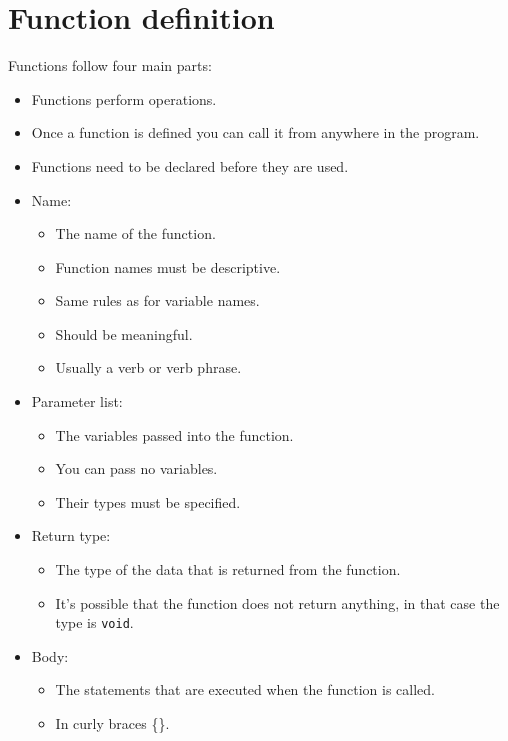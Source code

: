 \section{Function definition}
Functions follow four main parts:
\begin{itemize}
    \item Functions perform operations.
    \item Once a function is defined you can call it from anywhere in the program. 
    \item Functions need to be declared before they are used.
\end{itemize}
\begin{itemize}
    \item Name: 
        \begin{itemize}
            \item The name of the function.
            \item Function names must be descriptive.
            \item Same rules as for variable names.
            \item Should be meaningful.
            \item Usually a verb or verb phrase.
        \end{itemize}
    
    \item Parameter list:
        \begin{itemize}
            \item The variables passed into the function.
            \item You can pass no variables.
            \item Their types must be specified.
        \end{itemize}
    
    \item Return type:
        \begin{itemize}
            \item The type of the data that is returned from the function.
            \item It's possible that the function does not return anything, in that case the type is \texttt{void}.
        \end{itemize}
    
    \item Body: 
        \begin{itemize}
            \item The statements that are executed when the function is called.
            \item In curly braces \{\}.
        \end{itemize}
\end{itemize}

